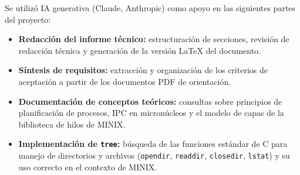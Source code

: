 \documentclass[11pt,a4paper]{article}
\begin{document}
Se utiliz\'o IA generativa (Claude, Anthropic) como apoyo en las siguientes partes del proyecto:

\begin{itemize}[leftmargin=*]
  \item \textbf{Redacci\'on del informe t\'ecnico:} estructuraci\'on de secciones, revisi\'on de redacci\'on t\'ecnica y generaci\'on de la versi\'on \LaTeX{} del documento.
  \item \textbf{S\'intesis de requisitos:} extracci\'on y organizaci\'on de los criterios de aceptaci\'on a partir de los documentos PDF de orientaci\'on.
  \item \textbf{Documentaci\'on de conceptos te\'oricos:} consultas sobre principios de planificaci\'on de procesos, IPC en micron\'ucleos y el modelo de capas de la biblioteca de hilos de MINIX.
  \item \textbf{Implementaci\'on de \texttt{tree}:} b\'usqueda de las funciones est\'andar de C para manejo de directorios y archivos (\texttt{opendir}, \texttt{readdir}, \texttt{closedir}, \texttt{lstat}) y su uso correcto en el contexto de MINIX.
\end{itemize}
\end{document}
